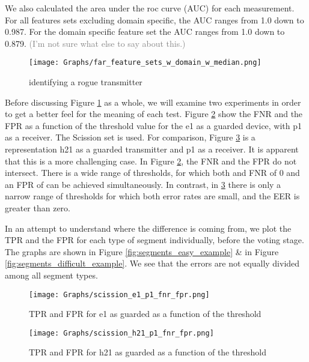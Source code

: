 \documentclass[conference]{IEEEtran}
\begin{document}
  We also calculated the area under the roc curve (AUC) for each measurement. For all features sets excluding domain specific, the AUC ranges from 1.0 down to 0.987. For the domain specific feature set the AUC ranges from 1.0 down to 0.879. \textcolor{gray}{(I'm not sure what else to say about this.)}
  
  \begin{figure}[t]
    \centering
    \texttt{[image: Graphs/far\_feature\_sets\_w\_domain\_w\_median.png]}
    \caption{identifying a rogue transmitter}
    \label{fig:rogue_transmitter_results}
  \end{figure}
  
  Before discussing Figure \ref{fig:rogue_transmitter_results} as a whole, we will examine two experiments in order to get a better feel for the meaning of each test. Figure \ref{fig:detection_easy_example} show the FNR and the FPR as a function of the threshold value for the e1 as a guarded device, with p1 as a receiver. The Scission set is used. For comparison, Figure \ref{fig:detection_difficult_example} is a representation h21 as a guarded transmitter and p1 as a receiver. It is apparent that this is a more challenging case. In Figure \ref{fig:detection_easy_example}, the FNR and the FPR do not intersect. There is a wide range of thresholds, for which both and FNR of 0 and an FPR of can be achieved simultaneously. In contrast, in \ref{fig:detection_difficult_example} there is only a narrow range of thresholds for which both error rates are small, and the EER is greater than zero.
  
  In an attempt to understand where the difference is coming from, we plot the TPR and the FPR for each type of segment individually, before the voting stage. The graphs are shown in Figure \ref{fig:segments_easy_example} \& in Figure \ref{fig:segments_difficult_example}. We see that the errors are not equally divided among all segment types.

  \begin{figure}[t]
    \centering
    \texttt{[image: Graphs/scission\_e1\_p1\_fnr\_fpr.png]}
    \caption{TPR and FPR for e1 as guarded as a function of the threshold}
    \label{fig:detection_easy_example}
  \end{figure}
  
  \begin{figure}[t]
    \centering
    \texttt{[image: Graphs/scission\_h21\_p1\_fnr\_fpr.png]}
    \caption{TPR and FPR for h21 as guarded as a function of the threshold}
    \label{fig:detection_difficult_example}
  \end{figure}
  
\end{document}

